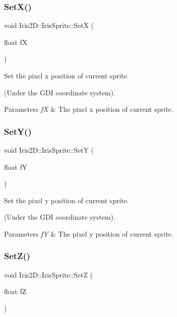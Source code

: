 \subsubsection{\texorpdfstring{Set\+X()}{SetX()}}
{\footnotesize\ttfamily void Iris2\+D\+::\+Iris\+Sprite\+::\+SetX (\begin{DoxyParamCaption}\item[{float}]{fX }\end{DoxyParamCaption})}



Set the pixel x position of current sprite. 

(Under the G\+DI coordinate system). 
\begin{DoxyParams}{Parameters}
{\em fX} & The pixel x position of current sprite. \\
\hline
\end{DoxyParams}
\mbox{\label{class_iris2_d_1_1_iris_sprite_a8064039bfeb3a364a8abeae7265cd429}} 
\subsubsection{\texorpdfstring{Set\+Y()}{SetY()}}
{\footnotesize\ttfamily void Iris2\+D\+::\+Iris\+Sprite\+::\+SetY (\begin{DoxyParamCaption}\item[{float}]{fY }\end{DoxyParamCaption})}



Set the pixel y position of current sprite. 

(Under the G\+DI coordinate system). 
\begin{DoxyParams}{Parameters}
{\em fY} & The pixel y position of current sprite. \\
\hline
\end{DoxyParams}
\mbox{\label{class_iris2_d_1_1_iris_sprite_a284d2af8d27d8fb72718e9554e0e90d9}} 
\subsubsection{\texorpdfstring{Set\+Z()}{SetZ()}}
{\footnotesize\ttfamily void Iris2\+D\+::\+Iris\+Sprite\+::\+SetZ (\begin{DoxyParamCaption}\item[{float}]{fZ }\end{DoxyParamCaption})}



